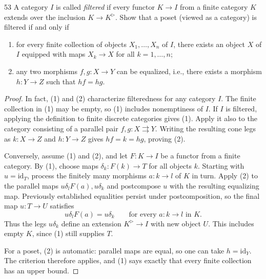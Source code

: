 \begin{exercise}{53}
A category $I$ is called \emph{filtered} if every functor $K\to I$ from a finite category $K$
extends over the inclusion $K\to K^{\rhd}$. Show that a poset (viewed as a category) is filtered
if and only if
\begin{enumerate}[label=(\arabic*)]
\item for every finite collection of objects $X_1,\ldots,X_n$ of $I$, there exists an object $X$ of $I$
equipped with maps $X_k\to X$ for all $k=1,\ldots,n$;
\item any two morphisms $f,g\colon X\to Y$ can be equalized, i.e., there exists a morphism $h\colon Y\to
Z$ such that $hf=hg$.
\end{enumerate}

\begin{proof}
In fact, (1) and (2) characterize filteredness for any category $I$.
The finite collection in (1) may be empty, so (1) includes
nonemptiness of $I$.
If $I$ is filtered, applying the definition to finite discrete
categories gives (1).
Apply it also to the category consisting of a parallel pair
$f,g\colon X\rightrightarrows Y$.
Writing the resulting cone legs as $k\colon X\to Z$ and
$h\colon Y\to Z$ gives $hf=k=hg$, proving (2).

Conversely, assume (1) and (2), and let $F\colon K\to I$
be a functor from a finite category.
By (1), choose maps $\delta_k\colon F(k)\to T$ for all objects $k$.
Starting with $u=\mathrm{id}_T$, process the finitely many
morphisms $a\colon k\to l$ of $K$ in turn.
Apply (2) to the parallel maps
$u\delta_lF(a),u\delta_k$ and postcompose $u$ with the
resulting equalizing map.
Previously established equalities persist under postcomposition,
so the final map $u\colon T\to U$ satisfies
\[
 u\delta_lF(a)=u\delta_k
 \qquad\text{for every }a\colon k\to l\text{ in }K.
\]
Thus the legs $u\delta_k$ define an extension
$K^{\rhd}\to I$ with new object $U$.
This includes empty $K$, since (1) still supplies $T$.

For a poset, (2) is automatic: parallel maps are equal,
so one can take $h=\mathrm{id}_Y$.
The criterion therefore applies, and (1) says exactly that
every finite collection has an upper bound.
\end{proof}
\end{exercise}
